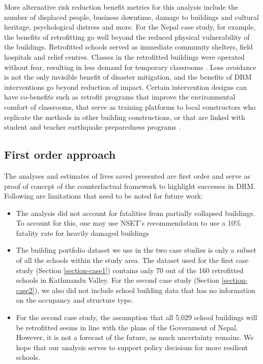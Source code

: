 \documentclass[utf8]{frontiersSCNS} %
\begin{document}
More alternative risk reduction benefit metrics for this analysis include the number of displaced people, business downtime, damage to buildings and cultural heritage, psychological distress and more. For the Nepal case study, for example, the benefits of retrofitting go well beyond the reduced physical vulnerability of the buildings. Retrofitted schools served as immediate community shelters, field hospitals and relief centres. Classes in the retrofitted buildings were operated without fear, resulting in less demand for temporary classrooms \citep{marasini2020}. Loss avoidance is not the only invisible benefit of disaster mitigation, and the benefits of DRM interventions go beyond reduction of impact. Certain intervention designs can have co-benefits such as retrofit programs that improve the environmental comfort of classrooms, that serve as training platforms to local constructors who replicate the methods in other building constructions, or that are linked with student and teacher earthquake preparedness programs \citep{spence2021buildings}.

\vspace{0.5cm} %

\subsection{First order approach}

The analyses and estimates of lives saved presented are first order and serve as proof of concept of the counterfactual framework to highlight successes in DRM. Following are limitations that need to be noted for future work:

\begin{itemize}
    \item 
    The analysis did not account for fatalities from partially collapsed buildings. To account for this, one may use NSET's recommendation to use a 10\% fatality rate for heavily damaged buildings \citep{nset2000}
    \item
    The building portfolio dataset we use in the two case studies is only a subset of all the schools within the study area. The dataset used for the first case study (Section \ref{section-case1}) contains only 70 out of the 160 retrofitted schools in Kathmandu Valley. For the second case study (Section \ref{section-case2}), we also did not include school building data that has no information on the occupancy and structure type.
    \item
    For the second case study, the assumption that all 5,029 school buildings will be retrofitted seems in line with the plans of the Government of Nepal. However, it is not a forecast of the future, as much uncertainty remains. We hope that our analysis serves to support policy decisions for more resilient schools.
\end{itemize}
\end{document}
